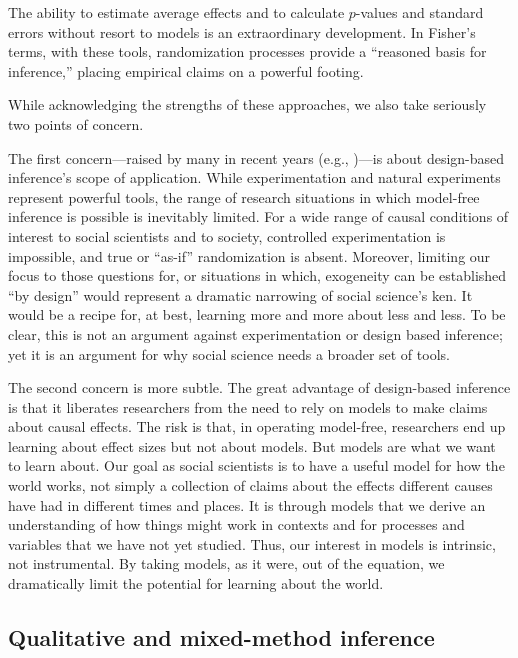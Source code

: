 \documentclass[12pt,]{book}
\begin{document}
The ability to estimate average effects and to calculate \(p\)-values and standard errors without resort to models is an extraordinary development. In Fisher's terms, with these tools, randomization processes provide a ``reasoned basis for inference,'' placing empirical claims on a powerful footing.

While acknowledging the strengths of these approaches, we also take seriously two points of concern.

The first concern---raised by many in recent years (e.g., \citet{thelen2015comparative})---is about design-based inference's scope of application. While experimentation and natural experiments represent powerful tools, the range of research situations in which model-free inference is possible is inevitably limited. For a wide range of causal conditions of interest to social scientists and to society, controlled experimentation is impossible, and true or ``as-if'' randomization is absent. Moreover, limiting our focus to those questions for, or situations in which, exogeneity can be established ``by design'' would represent a dramatic narrowing of social science's ken. It would be a recipe for, at best, learning more and more about less and less. To be clear, this is not an argument against experimentation or design based inference; yet it is an argument for why social science needs a broader set of tools.

The second concern is more subtle. The great advantage of design-based inference is that it liberates researchers from the need to rely on models to make claims about causal effects. The risk is that, in operating model-free, researchers end up learning about effect sizes but not about models. But models are what we want to learn about. Our goal as social scientists is to have a useful model for how the world works, not simply a collection of claims about the effects different causes have had in different times and places. It is through models that we derive an understanding of how things might work in contexts and for processes and variables that we have not yet studied. Thus, our interest in models is intrinsic, not instrumental. By taking models, as it were, out of the equation, we dramatically limit the potential for learning about the world.

\hypertarget{qualitative-and-mixed-method-inference}{%
\subsection{Qualitative and mixed-method inference}\label{qualitative-and-mixed-method-inference}}
\end{document}
